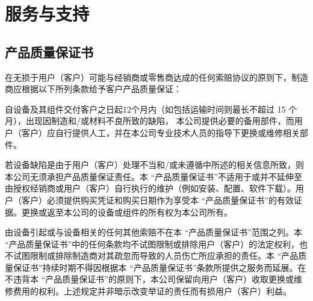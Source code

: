 \chapter{服务与支持}

\section{产品质量保证书}
\label{sec:产品质量保证书}

\newcommand{\TheSec}{本 “产品质量保证书”}
\newcommand{\User}{用户（客户）}

在无损于{\User}可能与经销商或零售商达成的任何索赔协议的原则下，制造商应根据以下所列条款给予客户产品质量保证：

自设备及其组件交付客户之日起12个月内（如包括运输时间则最长不超过 15 个月），出现因制造和/或材料不良所致的缺陷，
本公司提供必要的备用部件，而{\User}应自行提供人工，并在本公司专业技术人员的指导下更换或维修相关部件。

若设备缺陷是由于{\User}处理不当和/或未遵循{\ThisBook}中所述的相关信息所致，则本公司无须承担产品质量保证责任。{\TheSec}不适用于或并不延伸至由授权经销商或{\User}自行执行的维护（例如安装、配置、软件下载）。{\User}必须提供购买凭证和购买日期作为享受{\TheSec}的有效证据。更换或返至本公司的设备或组件的所有权为本公司所有。

由设备引起或与设备相关的任何其他索赔不在{\TheSec}范围之列。{\TheSec}中的任何条款均不试图限制或排除{\User}的法定权利，也不试图限制或排除制造商对其疏忽而导致的人员伤亡所应承担的责任。{\TheSec}持续时期不得因根据{\TheSec}条款所提供之服务而延展。在不违背{\TheSec}的原则下，本公司保留向{\User}收取更换或维修费用的权利。上述规定并非暗示改变举证的责任而有损{\User}利益。

